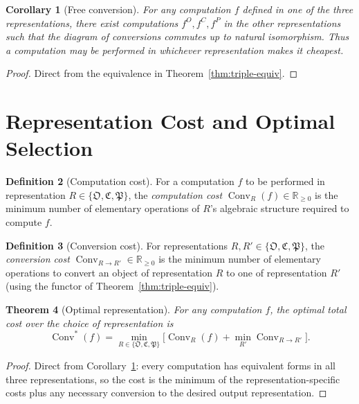 \documentclass[twocolumn,11pt,a4paper]{article}
\theoremstyle{thmstyle}
\newtheorem{theorem}{Theorem}[section]
\newtheorem{corollary}[theorem]{Corollary}
\theoremstyle{thmstyle}
\theoremstyle{definition}
\newtheorem{definition}[theorem]{Definition}
\theoremstyle{remark}
\DeclareMathOperator{\Conv}{Conv}
\newcommand{\Real}{\mathbb{R}}
\newcommand{\Osc}{\mathfrak{O}}
\newcommand{\Cat}{\mathfrak{C}}
\newcommand{\Part}{\mathfrak{P}}
\newcommand{\Cat}{\mathfrak{C}}
\begin{document}
\begin{corollary}[Free conversion]\label{cor:free-conversion}
For any computation $f$ defined in one of the three
representations, there exist computations $f^{O}, f^{C},
f^{P}$ in the other representations such that the
diagram of conversions commutes up to natural
isomorphism.  Thus a computation may be performed in
whichever representation makes it cheapest.
\end{corollary}

\begin{proof}
Direct from the equivalence in Theorem~\ref{thm:triple-equiv}.
\end{proof}

\section{Representation Cost and Optimal Selection}
\label{sec:rep-cost}

\begin{definition}[Computation cost]\label{def:comp-cost}
For a computation $f$ to be performed in representation
$R \in \{\Osc, \Cat, \Part\}$, the
\emph{computation cost}
$\Conv_{R}(f) \in \Real_{\geq 0}$ is the minimum
number of elementary operations of $R$'s algebraic
structure required to compute $f$.
\end{definition}

\begin{definition}[Conversion cost]\label{def:conv-cost}
For representations $R, R' \in \{\Osc, \Cat, \Part\}$,
the \emph{conversion cost}
$\Conv_{R \to R'} \in \Real_{\geq 0}$ is the minimum
number of elementary operations to convert an object
of representation $R$ to one of representation $R'$
(using the functor of Theorem~\ref{thm:triple-equiv}).
\end{definition}

\begin{theorem}[Optimal representation]\label{thm:opt-rep}
For any computation $f$, the optimal total cost over
the choice of representation is
\[
\Conv^{*}(f) = \min_{R \in \{\Osc, \Cat, \Part\}}
   \bigl[\Conv_{R}(f) +
          \min_{R'}\Conv_{R \to R'}\bigr].
\]
\end{theorem}

\begin{proof}
Direct from Corollary~\ref{cor:free-conversion}: every
computation has equivalent forms in all three
representations, so the cost is the minimum of the
representation-specific costs plus any necessary
conversion to the desired output representation.
\end{proof}
\end{document}
